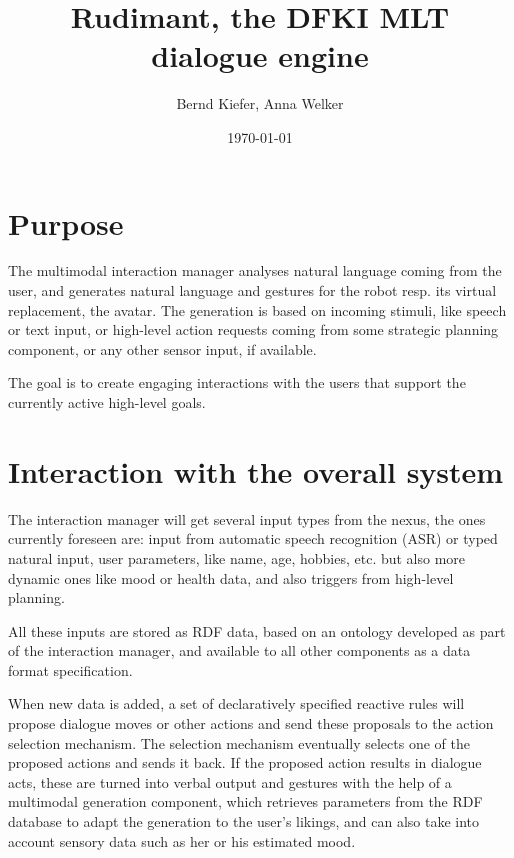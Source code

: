 \documentclass[a4paper]{memoir}
\begin{document}
\title{Rudimant, the DFKI MLT dialogue engine}
\author{Bernd Kiefer, Anna Welker}
\date{\today}

\maketitle

\tableofcontents

\chapter{Purpose}

The multimodal interaction manager analyses natural language coming from the
user, and generates natural language and gestures for the robot resp. its
virtual replacement, the avatar. The generation is based on incoming stimuli,
like speech or text input, or high-level action requests coming from some
strategic planning component, or any other sensor input, if available.

The goal is to create engaging interactions with the users that support the
currently active high-level goals.

\chapter{Interaction with the overall system}

The interaction manager will get several input types from the nexus, the ones
currently foreseen are: input from automatic speech recognition (ASR) or typed
natural input, user parameters, like name, age, hobbies, etc. but also more
dynamic ones like mood or health data, and also triggers from high-level
planning.

All these inputs are stored as RDF data, based on an ontology developed as part
of the interaction manager, and available to all other components as a data
format specification.

When new data is added, a set of declaratively specified reactive rules will
propose dialogue moves or other actions and send these proposals to the action
selection mechanism. The selection mechanism eventually selects one of the
proposed actions and sends it back. If the proposed action results in dialogue
acts, these are turned into verbal output and gestures with the help of a
multimodal generation component, which retrieves parameters from the RDF
database to adapt the generation to the user's likings, and can also take into
account sensory data such as her or his estimated mood.
\end{document}
